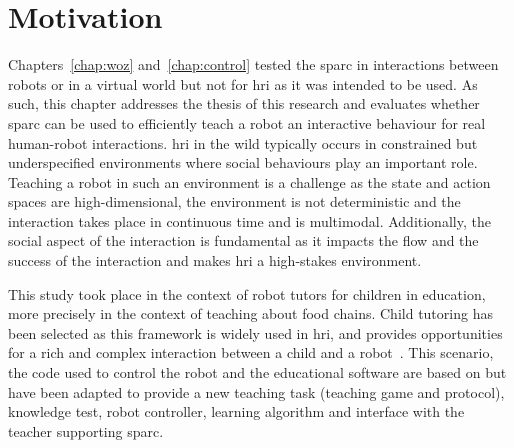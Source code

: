 \newpage

\section{Motivation}

Chapters~\ref{chap:woz} and~\ref{chap:control} tested the \gls{sparc} in interactions between robots or in a virtual world but not for \gls{hri} as it was intended to be used. As such, this chapter addresses the thesis of this research and evaluates whether \gls{sparc} can be used to efficiently teach a robot an interactive behaviour for real human-robot interactions. \gls{hri} in the wild typically occurs in constrained but underspecified environments where social behaviours play an important role. Teaching a robot in such an environment is a challenge as the state and action spaces are high-dimensional, the environment is not deterministic and the interaction takes place in continuous time and is multimodal. Additionally, the social aspect of the interaction is fundamental as it impacts the flow and the success of the interaction and makes \gls{hri} a high-stakes environment.%

This study took place in the context of robot tutors for children in education, more precisely in the context of teaching about food chains. Child tutoring has been selected as this framework is widely used in \gls{hri}, and provides opportunities for a rich and complex interaction between a child and a robot~\citep{leyzberg2012physical,kennedy2015robot}. This scenario, the code used to control the robot and the educational software are based on \cite{lemaignan2017free} but have been adapted to provide a new teaching task (teaching game and protocol), knowledge test, robot controller, learning algorithm and interface with the teacher supporting \gls{sparc}.


